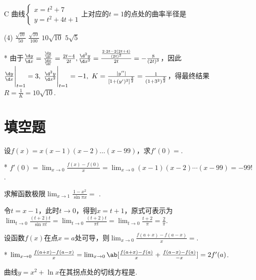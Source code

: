 \begin{choice}{C}
        曲线$\begin{cases}
        x=t^2+7\\
        y=t^2+4t+1
\end{cases}$上对应的$t=1$的点处的曲率半径是
\begin{tasks}(4)
        \task $\frac{\sqrt{10}}{50}$
        \task $\frac{\sqrt{10}}{100}$
        \task $10\sqrt{10}$
        \task $5\sqrt{5}$
\end{tasks}
\end{choice}
\begin{solution}*
        由于$\frac{\d y}{\d x} =\frac{\frac{\d y}{\d t} }{\frac{\d x}{\d t} }=
        \frac{2t-4}{2t},\frac{\d^2 y}{\d x^2}=\frac{\frac{2\cdot2t-2(2t+4)}{(2t)^2} }{2t}=
        -\frac{8}{(2t)^3}$，因此$\frac{\d y}{\d x}\Bigg|_{t=1}=3,\ \frac{\d^2 y}{\d x^2}\Bigg|_{t=1}=-1,\ K=\frac{|y''|}{[1+(y')^2]^{\frac{3}{2} }}=\frac{1}{(1+3^2)^{\frac{3}{2} }}$，得最终结果$R=\frac{1}{K}=10\sqrt{10}$.
\end{solution}

\section{填空题}
\begin{problem}
    设$f(x)=x(x-1)(x-2)\ldots(x-99)$，求$f'(0)=$.
\end{problem}
\begin{solution}*
        $f'(0)=\lim_{x \to 0}\frac{f(x)-f(0)}{x}=\lim_{x\to 0}(x-1)(x-2)\cdots(x-99)=-99!$.
\end{solution}
\begin{problem}
    求解函数极限$\lim_{x\to 1}\frac{1-x^2}{\sin \pi x}=$ .
\end{problem}
\begin{solution}
        令$t=x-1$，此时$t\to 0$，得到$x=t+1$，原式可表示为$\lim_{t\to 0}\frac{(t+2)t}{\sin \pi t}=\lim_{t \to 0}\frac{(t+2)t}{\pi t}=\lim_{t\to 0}\frac{t+2}{\pi}=\frac{2}{\pi}$.
\end{solution}
\begin{problem}
    设函数$f(x)$在点$x=a$处可导，则$\lim_{x \to 0}\frac{f(a+x)-f(a-x)}{x}=$.
\end{problem}
\begin{solution}*
        $\lim_{x\to 0}\frac{f(a+x)-f(a-x)}{x}=\lim_{x\to 0}\ab[\frac{f(a+x)-f(a)}{x}+\frac{f(a-x)-f(a)}{-x}]=2f'(a)$.
\end{solution}
\begin{problem}
    曲线$y=x^2+\ln x$在其拐点处的切线方程是.
\end{problem}

